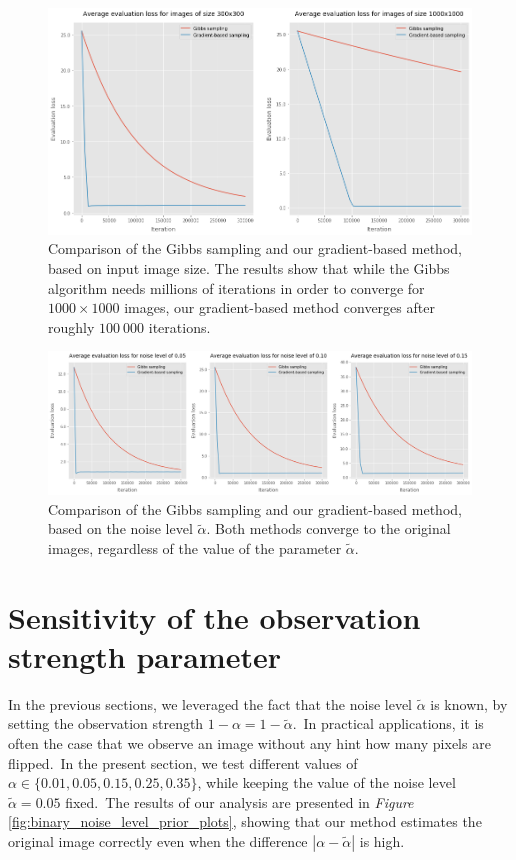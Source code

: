 \documentclass[shortabstract, english, lic]{iithesis}
\theoremstyle{default_theorem_style}\newtheorem{theorem}{Theorem}
\theoremstyle{default_theorem_style}\newtheorem{definition}{Definition}
\begin{document}
\begin{figure}[H]
\centering
\includegraphics[scale=0.38]{binary_input_size_plots}
\caption{Comparison of the Gibbs sampling and our gradient-based method, based on input image size. The results
show that while the Gibbs algorithm needs millions of iterations in order to converge for $1000{\times}1000$ images, our
gradient-based method converges after roughly $100\ 000$ iterations.}
\label{fig:binary_input_size_plots}
\end{figure}

\begin{figure}[H]
\centering
\includegraphics[scale=0.35]{binary_noise_level_plots}
\caption{Comparison of the Gibbs sampling and our gradient-based method, based on the noise level
$\tilde{\alpha}$. Both methods converge to the original images, regardless of the value of
the parameter $\tilde{\alpha}$.}
\label{fig:binary_noise_level_plots}
\end{figure}


\section{Sensitivity of the observation strength parameter}

In the previous sections, we leveraged the fact that the noise level $\tilde{\alpha}$ is known, by setting
the observation strength $1 - \alpha = 1 - \tilde{\alpha}$.\ In practical applications, it is often the case that
we observe an image without any hint how many pixels are flipped.\ In the present section,
we test different values of $\alpha \in \{0.01, 0.05, 0.15, 0.25, 0.35\}$, while keeping the value of the
noise level $\tilde{\alpha} = 0.05$ fixed.\ The results of our analysis are presented in
\textit{Figure} \ref{fig:binary_noise_level_prior_plots}, showing that our method estimates the original
image correctly even when the difference $|\alpha - \tilde{\alpha}|$ is high.
\end{document}
